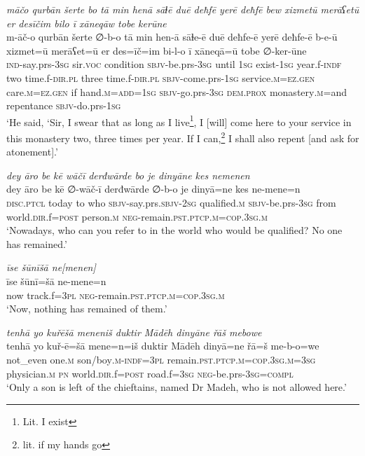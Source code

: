 \ea \label{ŠJ.98}
\textit{māčo qurbān šerte bo tā min henā sāɫē duē deħfē yerē deħfē bew xizmetū merāʕetū er desīčim bilo ī xāneqāw tobe kerūne} \\ 
\gll m-āč-o qurbān šerte ∅-b-o tā min hen-ā sāɫe-ē duē deħfe-ē yerē deħfe-ē b-e-ū xizmet=ū merāʕet=ū er des=īč=im bi-l-o ī xāneqā=ū tobe ∅-ker-ūne \\ 
 \textsc{ind-}say.prs\textsc{-3sg} sir.\textsc{voc} condition \textsc{sbjv-}be.prs\textsc{-3sg} until \textsc{1sg} exist\textsc{-\textsc{1sg}} year.f\textsc{-indf} two time.f\textsc{-dir}\textsc{.pl} three time.f\textsc{-dir}\textsc{.pl} \textsc{sbjv-}come.prs\textsc{-\textsc{1sg}} service\textsc{.m}\textsc{=ez.gen} care\textsc{.m}\textsc{=ez.gen} if hand\textsc{.m}\textsc{=add}\textsc{=\textsc{1sg}} \textsc{sbjv-}go.prs\textsc{-3sg} \textsc{dem.prox} monastery\textsc{.m}=and repentance \textsc{sbjv-}do.prs\textsc{-\textsc{1sg}} \\ 
\glt `He said, ‘Sir, I swear that as long as I live\footnote{Lit. I exist}, I [will] come here to your service in this monastery two, three times per year. If I can,\footnote{lit. if my hands go} I shall also repent [and ask for atonement].'
\z 
 
\ea \label{ŠJ.101}
\textit{dey āro be kē wāčī derđwārde bo je dinyāne kes nemenen} \\ 
\gll dey āro be kē ∅-wāč-ī derđwārde ∅-b-o je dinyā=ne kes ne-mene=n \\ 
 \textsc{disc.ptcl} today to who \textsc{sbjv-}say.prs.\textsc{sbjv-}\textsc{2sg} qualified\textsc{.m} \textsc{sbjv-}be.prs\textsc{-3sg} from world\textsc{.dir}.f\textsc{=\textsc{post}} person\textsc{.m} \textsc{neg-}remain\textsc{.pst}\textsc{.ptcp}\textsc{.m}\textsc{=cop}\textsc{.3sg}\textsc{.m} \\ 
\glt `Nowadays, who can you refer to in the world who would be qualified? No one has remained.'
\z 
 
\ea \label{ŠJ.104}
\textit{īse šūnīšā ne[menen]} \\ 
\gll īse šūnī=šā ne-mene=n \\ 
 now track.f\textsc{=3pl} \textsc{neg-}remain\textsc{.pst}\textsc{.ptcp}\textsc{.m}\textsc{=cop}\textsc{.3sg}\textsc{.m} \\ 
\glt `Now, nothing has remained of them.'
\z 
 
\ea \label{ŠJ.105}
\textit{tenhā yo kuřēšā meneniš duktir Mādēh dinyāne řāš mebowe} \\ 
\gll tenhā yo kuř-ē=šā mene=n=iš duktir Mādēh dinyā=ne řā=š me-b-o=we \\ 
 not\_even one\textsc{.m} son/boy\textsc{.m}\textsc{-indf}\textsc{=3pl} remain\textsc{.pst}\textsc{.ptcp}\textsc{.m}\textsc{=cop}\textsc{.3sg}\textsc{.m}\textsc{=3sg} physician\textsc{.m} \textsc{pn} world\textsc{.dir}.f\textsc{=\textsc{post}} road.f\textsc{=3sg} \textsc{neg-}be.prs\textsc{-3sg}\textsc{=compl} \\ 
\glt `Only a son is left of the chieftains, named Dr Madeh, who is not allowed here.'
\z 
 
